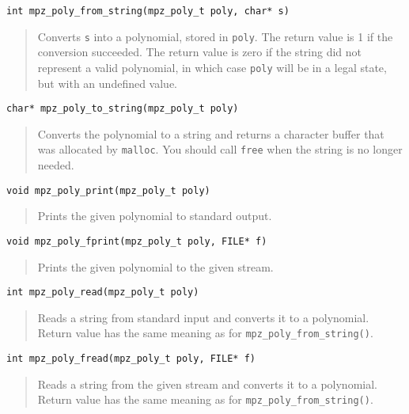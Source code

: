 \documentclass[a4paper,10pt]{article}
\newcommand{\code}{\lstinline}
\begin{document}
\begin{lstlisting}
int mpz_poly_from_string(mpz_poly_t poly, char* s)
\end{lstlisting}
\begin{quote}
Converts \code{s} into a polynomial, stored in \code{poly}. The return value is 1 if the conversion succeeded. The return value is zero if the string did not represent a valid polynomial, in which case \code{poly} will be in a legal state, but with an undefined value.
\end{quote}

\begin{lstlisting}
char* mpz_poly_to_string(mpz_poly_t poly)
\end{lstlisting}
\begin{quote}
Converts the polynomial to a string and returns a character buffer that was allocated by \code{malloc}. You should call \code{free} when the string is no longer needed.
\end{quote}

\begin{lstlisting}
void mpz_poly_print(mpz_poly_t poly)
\end{lstlisting}
\begin{quote}
Prints the given polynomial to standard output.
\end{quote}

\begin{lstlisting}
void mpz_poly_fprint(mpz_poly_t poly, FILE* f)
\end{lstlisting}
\begin{quote}
Prints the given polynomial to the given stream.
\end{quote}

\begin{lstlisting}
int mpz_poly_read(mpz_poly_t poly)
\end{lstlisting}
\begin{quote}
Reads a string from standard input and converts it to a polynomial. Return value has the same meaning as for \code{mpz_poly_from_string()}.
\end{quote}

\begin{lstlisting}
int mpz_poly_fread(mpz_poly_t poly, FILE* f)
\end{lstlisting}
\begin{quote}
Reads a string from the given stream and converts it to a polynomial. Return value has the same meaning as for \code{mpz_poly_from_string()}.
\end{quote}
\end{document}
